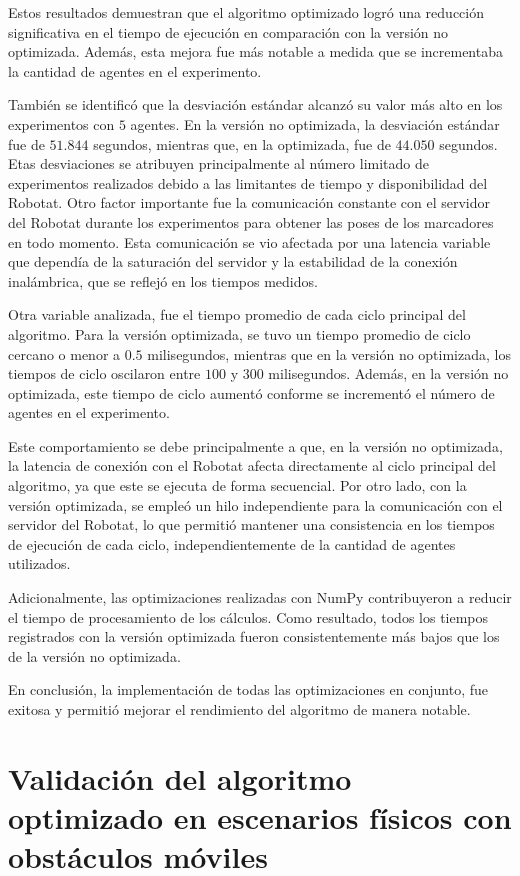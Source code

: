 Estos resultados demuestran que el algoritmo optimizado logró una reducción significativa en el tiempo de ejecución en comparación con la versión no optimizada. Además, esta mejora fue más notable a medida que se incrementaba la cantidad de agentes en el experimento.

También se identificó que la desviación estándar alcanzó su valor más alto en los experimentos con $5$ agentes. En la versión no optimizada, la desviación estándar fue de $51.844$ segundos, mientras que, en la optimizada, fue de $44.050$ segundos. Etas desviaciones se atribuyen principalmente al número limitado de experimentos realizados debido a las limitantes de tiempo y disponibilidad del Robotat. Otro factor importante fue la comunicación constante con el servidor del Robotat durante los experimentos para obtener las poses de los marcadores en todo momento. Esta comunicación se vio afectada por una latencia variable que dependía de la saturación del servidor y la estabilidad de la conexión inalámbrica, que se reflejó en los tiempos medidos.

Otra variable analizada, fue el tiempo promedio de cada ciclo principal del algoritmo. Para la versión optimizada, se tuvo un tiempo promedio de ciclo cercano o menor a $0.5$ milisegundos, mientras que en la versión no optimizada, los tiempos de ciclo oscilaron entre $100$ y $300$ milisegundos. Además, en la versión no optimizada, este tiempo de ciclo aumentó conforme se incrementó el número de agentes en el experimento.

Este comportamiento se debe principalmente a que, en la versión no optimizada, la latencia de conexión con el Robotat afecta directamente al ciclo principal del algoritmo, ya que este se ejecuta de forma secuencial. Por otro lado, con la versión optimizada, se empleó un hilo independiente para la comunicación con el servidor del Robotat, lo que permitió mantener una consistencia en los tiempos de ejecución de cada ciclo, independientemente de la cantidad de agentes utilizados. 

Adicionalmente, las optimizaciones realizadas con NumPy contribuyeron a reducir el tiempo de procesamiento de los cálculos. Como resultado, todos los tiempos registrados con la versión optimizada fueron consistentemente más bajos que los de la versión no optimizada.

En conclusión, la implementación de todas las optimizaciones en conjunto, fue exitosa y permitió mejorar el rendimiento del algoritmo de manera notable.

\chapter{Validación del algoritmo optimizado en escenarios físicos con obstáculos móviles}\label{cap:validacion}


